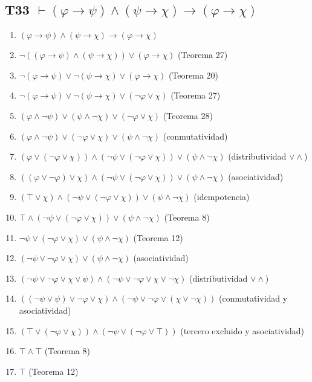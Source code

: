 \subsection{T33 $\vdash (\varphi \rightarrow \psi) \land (\psi \rightarrow \chi) \rightarrow (\varphi \rightarrow \chi)$}

\begin{enumerate}
    \item $(\varphi \rightarrow \psi) \land (\psi \rightarrow \chi) \rightarrow (\varphi \rightarrow \chi)$
    \item $\neg((\varphi \rightarrow \psi) \land (\psi \rightarrow \chi)) \lor (\varphi \rightarrow \chi)$ \hfill (Teorema 27)
    \item $\neg(\varphi \rightarrow \psi) \lor \neg(\psi \rightarrow \chi) \lor (\varphi \rightarrow \chi)$ \hfill (Teorema 20)
    \item $\neg(\varphi \rightarrow \psi) \lor \neg(\psi \rightarrow \chi) \lor (\neg\varphi \lor \chi)$ \hfill (Teorema 27)
    \item $(\varphi \land \neg\psi) \lor (\psi \land \neg\chi) \lor (\neg\varphi \lor \chi)$ \hfill (Teorema 28)
    \item $(\varphi \land \neg\psi) \lor (\neg\varphi \lor \chi) \lor (\psi \land \neg\chi)$ \hfill (conmutatividad)
    \item $(\varphi \lor (\neg\varphi \lor \chi)) \land (\neg\psi \lor (\neg\varphi \lor \chi)) \lor (\psi \land \neg\chi)$ \hfill (distributividad $\lor\land$)
    \item $((\varphi \lor \neg\varphi) \lor \chi) \land (\neg\psi \lor (\neg\varphi \lor \chi)) \lor (\psi \land \neg\chi)$ \hfill (asociatividad)
    \item $(\top \lor \chi) \land (\neg\psi \lor (\neg\varphi \lor \chi)) \lor (\psi \land \neg\chi)$ \hfill (idempotencia)
    \item $\top \land (\neg\psi \lor (\neg\varphi \lor \chi)) \lor (\psi \land \neg\chi)$ \hfill (Teorema 8)
    \item $\neg\psi \lor (\neg\varphi \lor \chi) \lor (\psi \land \neg\chi)$ \hfill (Teorema 12)
    \item $(\neg\psi \lor \neg\varphi \lor \chi) \lor (\psi \land \neg\chi)$ \hfill (asociatividad)
    \item $(\neg\psi \lor \neg\varphi \lor \chi \lor \psi) \land (\neg\psi \lor \neg\varphi \lor \chi \lor \neg\chi)$ \hfill (distributividad $\lor\land$)
    \item $((\neg\psi \lor \psi) \lor \neg\varphi \lor \chi) \land (\neg\psi \lor \neg\varphi \lor (\chi \lor \neg\chi))$ \hfill (conmutatividad y asociatividad)
    \item $(\top \lor (\neg\varphi \lor \chi)) \land (\neg\psi \lor (\neg\varphi \lor \top))$ \hfill (tercero excluido y asociatividad)
    \item $\top \land \top$ \hfill (Teorema 8)
    \item $\top$ \hfill (Teorema 12)
\end{enumerate}

